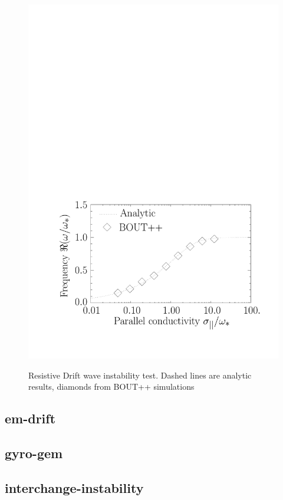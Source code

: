 \documentclass[12pt]{article}
\begin{document}
\begin{figure}[htbp!]
{  \includegraphics[scale=0.35]{figs/drift_freq.pdf}
}
\caption{Resistive Drift wave instability test. Dashed lines are analytic results, diamonds from BOUT++ simulations}
\label{fig:drift_test}
\end{figure}

\subsection{em-drift}

\subsection{gyro-gem}

\subsection{interchange-instability}
\end{document}
